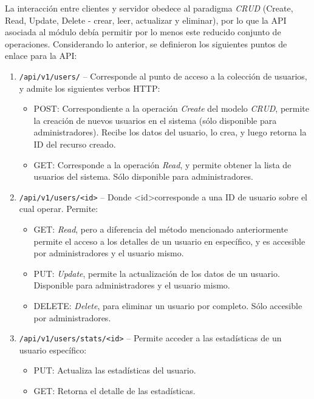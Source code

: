 \documentclass[11pt,letterpaper]{article}
\begin{document}
La interacción entre clientes y servidor obedece al paradigma \emph{CRUD} (Create, Read, Update, Delete - crear, leer, actualizar y eliminar), por lo que la API asociada al módulo debía permitir por lo menos este reducido conjunto de operaciones. Considerando lo anterior, se definieron los siguientes puntos de enlace para la API:

\begin{enumerate}
    \item \texttt{/api/v1/users/} -- Corresponde al punto de acceso a la colección de usuarios, y admite los siguientes verbos HTTP:
    \begin{itemize}
        \item POST: Correspondiente a la operación \emph{Create} del modelo \emph{CRUD}, permite la creación de nuevos usuarios en el sistema (sólo disponible para administradores). Recibe los datos del usuario, lo crea, y luego retorna la ID del recurso creado.
        \item GET: Corresponde a la operación \emph{Read}, y permite obtener la lista de usuarios del sistema. Sólo disponible para administradores.
    \end{itemize}
    \newpage
    \item \texttt{/api/v1/users/\textless id\textgreater} -- Donde \textless id\textgreater \@ corresponde a una ID de usuario sobre el cual operar. Permite:
    \begin{itemize}
        \item GET: \emph{Read}, pero a diferencia del método mencionado anteriormente permite el acceso a los detalles de un usuario en específico, y es accesible por administradores y el usuario mismo.
        \item PUT: \emph{Update}, permite la actualización de los datos de un usuario. Disponible para administradores y el usuario mismo.
        \item DELETE: \emph{Delete}, para eliminar un usuario por completo. Sólo accesible por administradores.
    \end{itemize}
    \item \texttt{/api/v1/users/stats/\textless id\textgreater} -- Permite acceder a las estadísticas de un usuario específico:
    \begin{itemize}
        \item PUT: Actualiza las estadísticas del usuario.
        \item GET: Retorna el detalle de las estadísticas.
    \end{itemize}
\end{enumerate}
\end{document}
